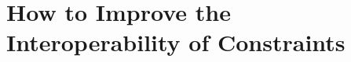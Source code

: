 \documentclass{llncs}
\newenvironment{DL}{
  \vspace{0cm}
	\begin{center}
  \begin{tabular}{r l}

}{
  \end{tabular}
	\end{center}
}
\begin{document}

%
%
%

\section{How to Improve the Interoperability of Constraints}
\label{sec:transformations}
\end{document}
